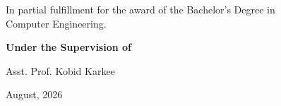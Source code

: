 \begin{titlepage}
\begin{center}
    \vspace{0.4cm}
    
    \normalsize
    In partial fulfillment for the award of the Bachelor's Degree in\\
    Computer Engineering.\\
    
    \vspace{0.4cm}
    
    \textbf{\normalsize Under the Supervision of}\\
    
    \vspace{0.2cm}
    
    \normalsize
    Asst. Prof. Kobid Karkee\\
    
    \vspace{0.6cm}
    
    \normalsize
    August, 2026\\
    
\end{center}
\end{titlepage}